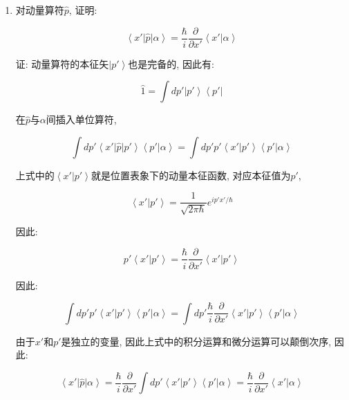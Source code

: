 \begin{enumerate}

\item 对动量算符$\hat p$, 证明:

\begin{equation*}
\left\langle x' \right| \hat p \left| \alpha \right\rangle
=\frac{\hbar}{i} \frac{\partial }{\partial x'} \left\langle x' |
\alpha \right\rangle
\end{equation*}



证: 动量算符的本征矢$\left| p' \right\rangle$也是完备的, 因此有:

\begin{equation*}
\hat 1 = \int dp' \left| p' \right\rangle \left\langle p' \right|
\end{equation*}

在$\hat p$与$\alpha$间插入单位算符,

\begin{equation*}
\int dp' \left\langle x' \right| \hat p \left| p' \right\rangle
\left\langle p' | \alpha \right\rangle = \int dp' p' \left\langle x'
| p' \right\rangle \left\langle p' | \alpha \right\rangle
\end{equation*}

上式中的$\left\langle x' | p'
\right\rangle$就是位置表象下的动量本征函数, 对应本征值为$p'$,


\begin{equation*}
\left\langle x' | p' \right\rangle = \frac{1}{\sqrt {2\pi \hbar}}
e^{ip'x'/\hbar}
\end{equation*}

因此:

\begin{equation*}
p' \left\langle x' | p' \right\rangle = \frac{\hbar}{i}
\frac{\partial}{\partial x'} \left\langle x' | p' \right\rangle
\end{equation*}

因此:

\begin{equation*}
\int dp' p' \left\langle x' | p' \right\rangle \left\langle p' |
\alpha \right\rangle = \int dp' \frac{\hbar}{i}
\frac{\partial}{\partial x'} \left\langle x' | p' \right\rangle
\left\langle p' | \alpha \right\rangle
\end{equation*}

由于$x'$和$p'$是独立的变量,
因此上式中的积分运算和微分运算可以颠倒次序, 因此:


\begin{equation*}
\left\langle x' \right| \hat p \left| \alpha \right\rangle =
\frac{\hbar}{i} \frac{\partial}{\partial x'} \int dp' \left\langle
x' | p' \right\rangle \left\langle p' | \alpha \right\rangle =
\frac{\hbar}{i} \frac{\partial }{\partial x'} \left\langle x' |
\alpha \right\rangle
\end{equation*}


\end{enumerate}
